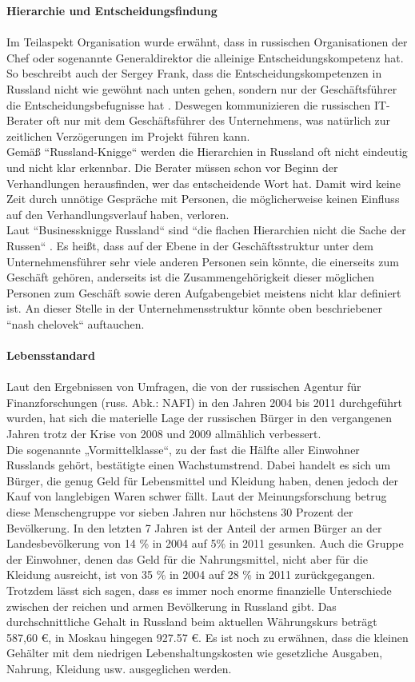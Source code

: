 	 	 \textbf{Hierarchie und Entscheidungsfindung}\\
	 	 \\
	 Im Teilaspekt Organisation wurde erwähnt, dass in russischen Organisationen der Chef oder sogenannte Generaldirektor die alleinige Entscheidungskompetenz hat. So beschreibt auch der Sergey Frank, dass die Entscheidungskompetenzen in Russland nicht wie gewöhnt nach unten gehen, sondern nur der Geschäftsführer die Entscheidungsbefugnisse hat \cite{RuSFI}.
	 Deswegen kommunizieren die russischen IT-Berater oft nur mit dem Geschäftsführer des Unternehmens, was natürlich zur zeitlichen Verzögerungen im Projekt führen kann.\\
	 Gemäß ``Russland-Knigge`` \cite{RusKnigge} werden die Hierarchien in Russland oft  nicht eindeutig und nicht klar erkennbar. Die Berater müssen schon vor Beginn der Verhandlungen herausfinden, wer das entscheidende Wort hat. Damit wird keine Zeit durch unnötige Gespräche mit Personen, die möglicherweise keinen Einfluss auf den Verhandlungsverlauf haben, verloren.\\
	 Laut ``Businessknigge Russland`` sind ``die flachen Hierarchien nicht die Sache der Russen`` \cite{RusKnigge}. Es heißt, dass auf der Ebene in der Geschäftsstruktur unter dem Unternehmensführer  sehr viele anderen Personen sein könnte, die einerseits zum Geschäft gehören, anderseits ist die Zusammengehörigkeit dieser möglichen Personen zum Geschäft sowie deren Aufgabengebiet meistens nicht klar definiert ist. An dieser Stelle in der Unternehmensstruktur könnte oben beschriebener ``nash chelovek`` auftauchen.
	\\ \\
		 	 \textbf{Lebensstandard}\\ \\
	Laut den Ergebnissen von Umfragen, die von der russischen Agentur für Finanzforschungen (russ. Abk.: NAFI) in den Jahren 2004 bis 2011 durchgeführt wurden, hat sich die materielle Lage der russischen Bürger in den vergangenen  Jahren trotz der Krise von 2008 und 2009 allmählich verbessert.\\
	 Die sogenannte „Vormittelklasse“, zu der fast die Hälfte aller Einwohner Russlands gehört, bestätigte einen Wachstumstrend. Dabei handelt es sich um Bürger, die genug Geld für Lebensmittel und Kleidung haben, denen jedoch der Kauf von langlebigen Waren schwer fällt. Laut der Meinungsforschung betrug diese Menschengruppe vor sieben Jahren nur höchstens 30 Prozent der Bevölkerung. In den letzten 7 Jahren ist der Anteil der armen Bürger an der Landesbevölkerung von 14 \% in 2004 auf 5\% in 2011 gesunken. Auch die Gruppe der Einwohner, denen das Geld für die Nahrungsmittel, nicht aber für die Kleidung ausreicht, ist von 35 \% in 2004 auf 28 \% in 2011 zurückgegangen.\\
	 Trotzdem lässt sich sagen, dass es immer noch enorme finanzielle Unterschiede zwischen der reichen und armen Bevölkerung in Russland gibt. Das durchschnittliche Gehalt in Russland beim aktuellen Währungskurs beträgt 587,60 €, in Moskau hingegen 927.57 €. Es ist noch zu erwähnen, dass die kleinen Gehälter mit dem niedrigen Lebenshaltungskosten wie gesetzliche Ausgaben, Nahrung, Kleidung usw. ausgeglichen werden. 
